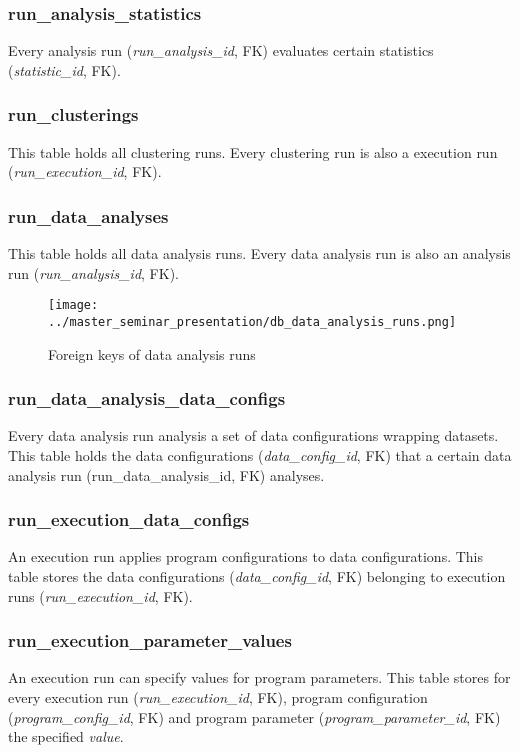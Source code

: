 	\subsubsection{run\_analysis\_statistics}
	Every analysis run (\textit{run\_analysis\_id}, FK) evaluates certain statistics (\textit{statistic\_id}, FK).
	
	\subsubsection{run\_clusterings}
	This table holds all clustering runs. Every clustering run is also a execution run (\textit{run\_execution\_id}, FK).
	
	\subsubsection{run\_data\_analyses}
	This table holds all data analysis runs. Every data analysis run is also an analysis run (\textit{run\_analysis\_id}, FK).

\begin{figure}[hbtp]
\caption{Foreign keys of data analysis runs}
\label{fig_data_analysis_runs_foreign_keys}
\centering
\texttt{[image: ../master\_seminar\_presentation/db\_data\_analysis\_runs.png]}
\end{figure} 
	
	\subsubsection{run\_data\_analysis\_data\_configs}
	Every data analysis run analysis a set of data configurations wrapping datasets. This table holds the data configurations (\textit{data\_config\_id}, FK) that a certain data analysis run (run\_data\_analysis\_id, FK) analyses.
	
	\subsubsection{run\_execution\_data\_configs}
	An execution run applies program configurations to data configurations. This table stores the data configurations (\textit{data\_config\_id}, FK) belonging to execution runs (\textit{run\_execution\_id}, FK).
	
	\subsubsection{run\_execution\_parameter\_values}
	An execution run can specify values for program parameters. This table stores for every execution run (\textit{run\_execution\_id}, FK), program configuration (\textit{program\_config\_id}, FK) and program parameter (\textit{program\_parameter\_id}, FK) the specified \textit{value}.
	
